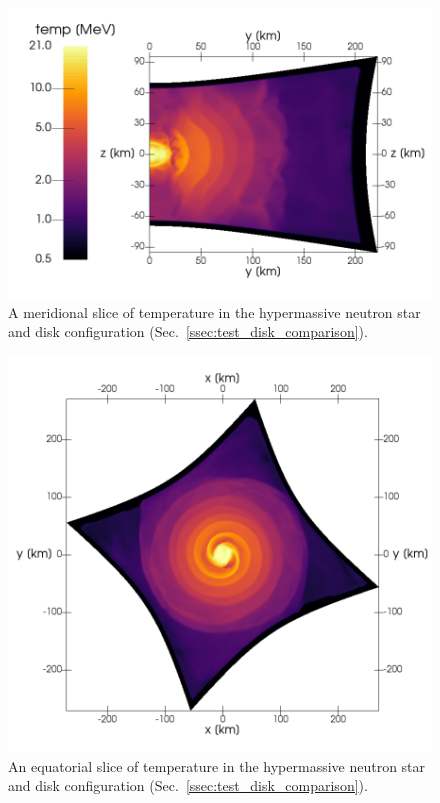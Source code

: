 \documentclass[aps,floatfix,prd,superscriptaddress,twocolumn]{revtex4-1}
\begin{document}
\begin{figure}
  \includegraphics[width=\columnwidth]{production-colormap-merid-temp}
  \caption{A meridional slice of temperature in the hypermassive neutron
    star and disk configuration (Sec.~\ref{ssec:test_disk_comparison}).}
  \label{fig:nsns_temp_merid}
\end{figure}

\begin{figure}
  \includegraphics[width=\columnwidth]{production-colormap-equat-temp}
  \caption{An equatorial slice of temperature in the hypermassive neutron
    star and disk configuration (Sec.~\ref{ssec:test_disk_comparison}).}
  \label{fig:nsns_temp_equat}
\end{figure}
\end{document}
